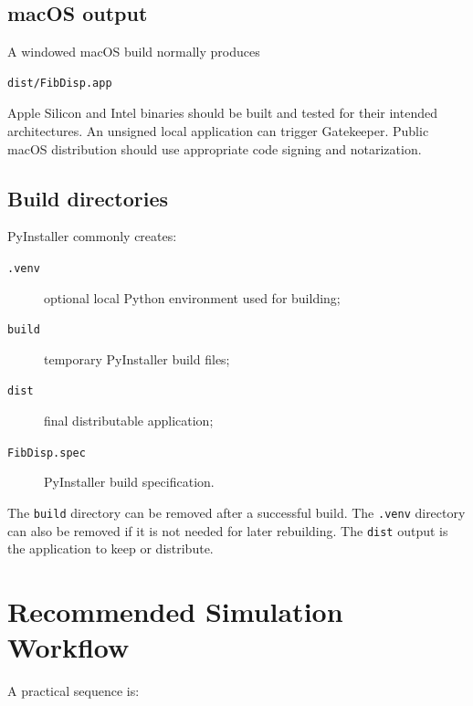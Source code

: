 \documentclass[11pt,a4paper]{article}
\begin{document}
\subsection{macOS output}

A windowed macOS build normally produces

\begin{lstlisting}
dist/FibDisp.app
\end{lstlisting}

Apple Silicon and Intel binaries should be built and tested for their intended
architectures. An unsigned local application can trigger Gatekeeper. Public
macOS distribution should use appropriate code signing and notarization.

\subsection{Build directories}

PyInstaller commonly creates:

\begin{description}
    \item[\texttt{.venv}] optional local Python environment used for building;
    \item[\texttt{build}] temporary PyInstaller build files;
    \item[\texttt{dist}] final distributable application;
    \item[\texttt{FibDisp.spec}] PyInstaller build specification.
\end{description}

The \texttt{build} directory can be removed after a successful build. The
\texttt{.venv} directory can also be removed if it is not needed for later
rebuilding. The \texttt{dist} output is the application to keep or distribute.

\section{Recommended Simulation Workflow}

A practical sequence is:
\end{document}

